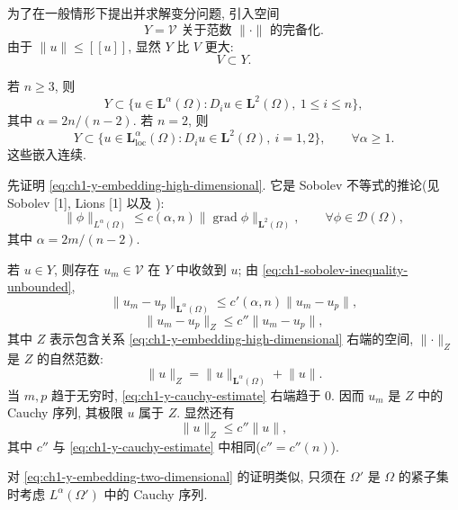 为了在一般情形下提出并求解变分问题, 引入空间
\begin{equation}
Y=\mathcal V\text{ 关于范数 }\lVert\cdot\rVert\text{ 的完备化}.
\label{eq:ch1-y-space-definition}
\end{equation}
由于 $\lVert u\rVert\leq[[u]]$, 显然 $Y$ 比 $V$ 更大:
\begin{equation}
V\subset Y.
\label{eq:ch1-v-in-y}
\end{equation}

\begin{Lemma}
\label{lem:ch1-y-space-embeddings}
若 $n\geq3$, 则
\begin{equation}
Y\subset\{u\in\mathbf L^\alpha(\Omega):D_i u\in\mathbf L^2(\Omega),\ 1\leq i\leq n\},
\label{eq:ch1-y-embedding-high-dimensional}
\end{equation}
其中 $\alpha=2n/(n-2)$. 若 $n=2$, 则
\begin{equation}
Y\subset\{u\in\mathbf L^\alpha_{\mathrm{loc}}(\Omega):D_i u\in\mathbf L^2(\Omega),\ i=1,2\},
\qquad\forall\alpha\geq1.
\label{eq:ch1-y-embedding-two-dimensional}
\end{equation}
这些嵌入连续.
\end{Lemma}

\begin{Proof}
先证明 \eqref{eq:ch1-y-embedding-high-dimensional}. 它是 Sobolev 不等式的推论(见 Sobolev [1], Lions [1] 以及 ):
\begin{equation}
\lVert\phi\rVert_{L^\alpha(\Omega)}
\leq c(\alpha,n)\lVert\operatorname{grad}\phi\rVert_{\mathbf L^2(\Omega)},
\qquad\forall\phi\in\mathcal D(\Omega),
\label{eq:ch1-sobolev-inequality-unbounded}
\end{equation}
其中 $\alpha=2m/(n-2)$.

若 $u\in Y$, 则存在 $u_m\in\mathcal V$ 在 $Y$ 中收敛到 $u$; 由 \eqref{eq:ch1-sobolev-inequality-unbounded},
\[
\lVert u_m-u_p\rVert_{\mathbf L^\alpha(\Omega)}
\leq c'(\alpha,n)\lVert u_m-u_p\rVert,
\]
\begin{equation}
\lVert u_m-u_p\rVert_Z\leq c''\lVert u_m-u_p\rVert,
\label{eq:ch1-y-cauchy-estimate}
\end{equation}
其中 $Z$ 表示包含关系 \eqref{eq:ch1-y-embedding-high-dimensional} 右端的空间, $\lVert\cdot\rVert_Z$ 是 $Z$ 的自然范数:
\[
\lVert u\rVert_Z=\lVert u\rVert_{\mathbf L^\alpha(\Omega)}+\lVert u\rVert.
\]
当 $m,p$ 趋于无穷时, \eqref{eq:ch1-y-cauchy-estimate} 右端趋于 $0$. 因而 $u_m$ 是 $Z$ 中的 Cauchy 序列, 其极限 $u$ 属于 $Z$. 显然还有
\[
\lVert u\rVert_Z\leq c''\lVert u\rVert,
\]
其中 $c''$ 与 \eqref{eq:ch1-y-cauchy-estimate} 中相同($c''=c''(n)$).

对 \eqref{eq:ch1-y-embedding-two-dimensional} 的证明类似, 只须在 $\Omega'$ 是 $\Omega$ 的紧子集时考虑 $L^\alpha(\Omega')$ 中的 Cauchy 序列.
\end{Proof}

